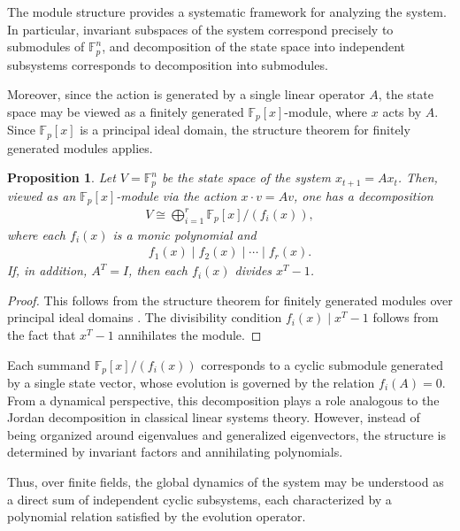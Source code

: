\documentclass[letterpaper, 9pt, conference]{ieeeconf}
\newtheorem{proposition}[theorem]{Proposition}
\begin{document}
The module structure provides a systematic framework for analyzing the system.
In particular, invariant subspaces of the system correspond precisely to
submodules of $\mathbb{F}_p^n$, and decomposition of the state space into
independent subsystems corresponds to decomposition into submodules.

Moreover, since the action is generated by a single linear operator \(A\), the
state space may be viewed as a finitely generated \(\mathbb{F}_p[x]\)-module,
where \(x\) acts by \(A\). Since \(\mathbb{F}_p[x]\) is a principal ideal domain,
the structure theorem for finitely generated modules applies.

\begin{proposition}
Let $V = \mathbb{F}_p^n$ be the state space of the system
$x_{t+1} = Ax_t$. Then, viewed as an $\mathbb{F}_p[x]$-module via the action
$x \cdot v = Av$, one has a decomposition
\begin{eqnarray}
V \cong \bigoplus_{i=1}^r \mathbb{F}_p[x]/(f_i(x)),
\end{eqnarray}
where each $f_i(x)$ is a monic polynomial and
\begin{eqnarray}
f_1(x)\mid f_2(x)\mid \cdots \mid f_r(x).
\end{eqnarray}
If, in addition, $A^T = I$, then each $f_i(x)$ divides $x^T - 1$.
\end{proposition}

\begin{proof}
This follows from the structure theorem for finitely generated modules over
principal ideal domains \cite{dummit_foote,lang_algebra_book}. The divisibility
condition \(f_i(x)\mid x^T-1\) follows from the fact that \(x^T-1\) annihilates
the module.
\end{proof}

Each summand $\mathbb{F}_p[x]/(f_i(x))$ corresponds to a cyclic submodule
generated by a single state vector, whose evolution is governed by the relation
$f_i(A)=0$. From a dynamical perspective, this decomposition plays a role analogous to the
Jordan decomposition in classical linear systems theory. However, instead of
being organized around eigenvalues and generalized eigenvectors, the structure
is determined by invariant factors and annihilating polynomials.

Thus, over finite fields, the global dynamics of the system may be understood as
a direct sum of independent cyclic subsystems, each characterized by a
polynomial relation satisfied by the evolution operator.
\end{document}
